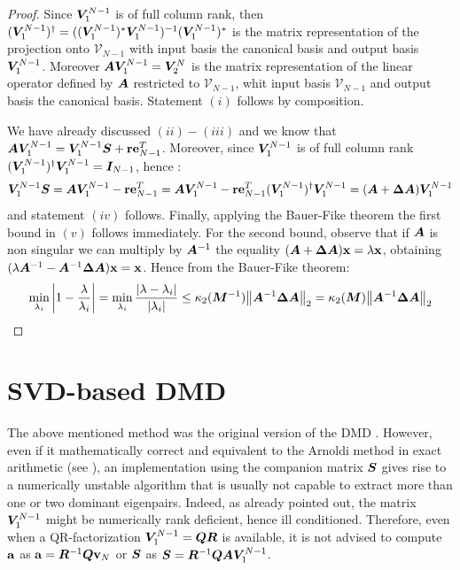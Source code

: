 \begin{proof}
Since $\vb*{V}_1^{N-1}$ is of full column rank, then $(\vb*{V}_1^{N-1})^{\dagger} = ((\vb*{V}_1^{N-1})^{*}\vb*{V}_1^{N-1})^{-1}(\vb*{V}_1^{N-1})^{*}$ is the matrix representation of the projection onto $\mathcal{V}_{N-1}$ with input basis the canonical basis and output basis $\vb*{V}_1^{N-1}$. Moreover $\vb*{A}\vb*{V}_1^{N-1} = \vb*{V}_2^{N}$ is the matrix representation of the linear operator defined by $\vb*{A}$ restricted to $\mathcal{V}_{N-1}$, whit input basis $\mathcal{V}_{N-1}$ and output basis the canonical basis. Statement $(i)$ follows by composition.

We have already discussed $(ii)-(iii)$ and we know that $\vb*{A}\vb*{V}_1^{N-1}  = \vb*{V}_1^{N-1}\vb*{S} + \vb{r}\vb{e}_{N-1}^T$. Moreover, since $\vb*{V}_1^{N-1}$ is of full column rank $(\vb*{V}_1^{N-1})^{\dagger}\vb*{V}_1^{N-1} = \vb*{I}_{N-1}$, hence :
\begin{equation*}
    \vb*{V}_1^{N-1}\vb*{S} = \vb*{A}\vb*{V}_1^{N-1} - \vb{r}\vb{e}_{N-1}^T = \vb*{A}\vb*{V}_1^{N-1} - \vb{r}\vb{e}_{N-1}^T (\vb*{V}_1^{N-1})^{\dagger}\vb*{V}_1^{N-1}  = (\vb*{A} + \vb*{\Delta A})\vb*{V}_1^{N-1} 
\end{equation*}
and statement $(iv)$ follows. Finally, applying the Bauer-Fike theorem \cite{golub_matrix_2013} the first bound in $(v)$ follows immediately. For the second bound, observe that if $\vb*{A}$ is non singular we can multiply by $\vb*{A}^{-1}$ the equality $(\vb*{A} + \vb*{\Delta A})\vb{x} = \lambda \vb{x}$, obtaining $(\lambda \vb*{A}^{-1}  - \vb*{A}^{-1}\vb*{\Delta A})\vb{x} = \vb{x}$. Hence from the Bauer-Fike theorem:
\begin{equation*}
    \min_{\lambda_i}\abs{1 - \frac{\lambda}{\lambda_i}} = \min_{\lambda_i}\frac{\abs{\lambda - \lambda_i}}{\abs{\lambda_i}} \leq  \kappa_2(\vb*{M}^{-1})\norm{\vb*{A}^{-1}\vb*{\Delta A}}_2 = \kappa_2(\vb*{M})\norm{\vb*{A}^{-1}\vb*{\Delta A}}_2
\end{equation*}
\end{proof}

\section{SVD-based DMD}
The above mentioned method was the original version of the DMD \cite{schmid_dynamic_2010}. However, even if it mathematically correct and equivalent to the Arnoldi method in exact arithmetic (see ), an implementation using the companion matrix $\vb*{S}$ gives rise to a numerically unstable algorithm that is usually not capable to extract more than one or two dominant eigenpairs. Indeed, as already pointed out, the matrix $\vb*{V}_1^{N-1}$ might be numerically rank deficient, hence ill conditioned. Therefore, even when a QR-factorization $\vb*{V}_1^{N-1} = \vb*{Q}\vb*{R}$ is available, it is not advised to compute $\vb{a}$ as $\vb{a} = \vb*{R}^{-1}\vb*{Q}\vb{v}_N$ or $\vb*{S}$ as $\vb*{S} = \vb*{R}^{-1}\vb*{Q}\vb*{A}\vb*{V}_1^{N-1}$. 

